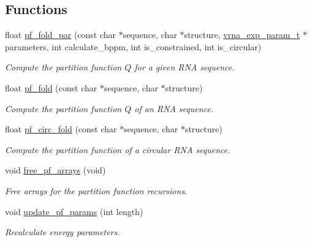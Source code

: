 \subsection*{Functions}
\begin{DoxyCompactItemize}
\item 
float \mbox{\hyperlink{group__part__func__global__deprecated_gac4f95bee734b2563a3d6e9932117ebdf}{pf\+\_\+fold\+\_\+par}} (const char $\ast$sequence, char $\ast$structure, \mbox{\hyperlink{group__energy__parameters_ga01d8b92fe734df8d79a6169482c7d8d8}{vrna\+\_\+exp\+\_\+param\+\_\+t}} $\ast$parameters, int calculate\+\_\+bppm, int is\+\_\+constrained, int is\+\_\+circular)
\begin{DoxyCompactList}\small\item\em Compute the partition function $Q$ for a given R\+NA sequence. \end{DoxyCompactList}\item 
float \mbox{\hyperlink{group__part__func__global__deprecated_gadc3db3d98742427e7001a7fd36ef28c2}{pf\+\_\+fold}} (const char $\ast$sequence, char $\ast$structure)
\begin{DoxyCompactList}\small\item\em Compute the partition function $Q$ of an R\+NA sequence. \end{DoxyCompactList}\item 
float \mbox{\hyperlink{group__part__func__global__deprecated_ga819ce5fca8984004ac81c4a3b04cb735}{pf\+\_\+circ\+\_\+fold}} (const char $\ast$sequence, char $\ast$structure)
\begin{DoxyCompactList}\small\item\em Compute the partition function of a circular R\+NA sequence. \end{DoxyCompactList}\item 
void \mbox{\hyperlink{group__part__func__global__deprecated_gae73db3f49a94f0f72e067ecd12681dbd}{free\+\_\+pf\+\_\+arrays}} (void)
\begin{DoxyCompactList}\small\item\em Free arrays for the partition function recursions. \end{DoxyCompactList}\item 
void \mbox{\hyperlink{group__part__func__global__deprecated_ga384e927890f9c034ff09fa66da102d28}{update\+\_\+pf\+\_\+params}} (int length)
\begin{DoxyCompactList}\small\item\em Recalculate energy parameters. \end{DoxyCompactList}\item 

\end{DoxyCompactItemize}
